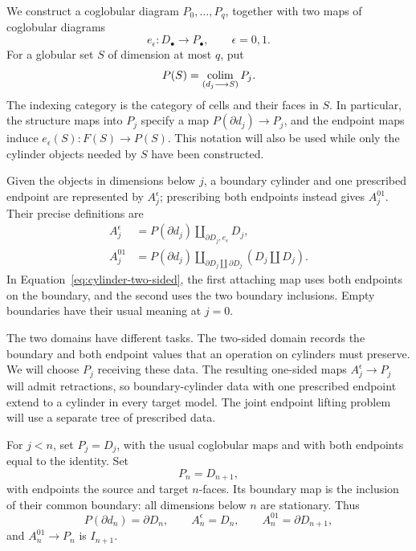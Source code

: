 We construct a coglobular diagram \(P_0,\ldots,P_q\), together with
two maps of coglobular diagrams
\[
             e_\epsilon:D_\bullet\longrightarrow P_\bullet,
             \qquad \epsilon=0,1.
\]
For a globular set \(S\) of dimension at most \(q\), put
\begin{equation}\label{eq:cylinder-realization}
 P(S)=\operatorname*{colim}_{(d_j\longrightarrow S)}P_j.
\end{equation}
The indexing category is the category of cells and their faces in
\(S\).  In particular, the structure maps into \(P_j\) specify a
map \(P(\partial d_j)\to P_j\), and the endpoint maps induce
\(e_\epsilon(S):F(S)\to P(S)\).  This notation will also be used
while only the cylinder objects needed by \(S\) have been constructed.

Given the objects in dimensions below \(j\), a boundary cylinder and
one prescribed endpoint are represented by \(A_j^\epsilon\); prescribing
both endpoints instead gives \(A_j^{01}\).  Their precise definitions are
\begin{align}
 A_j^\epsilon
   &=P(\partial d_j)\amalg_{\partial D_j,e_\epsilon}D_j,
       \label{eq:cylinder-one-sided}\\
 A_j^{01}
   &=P(\partial d_j)
       \amalg_{\partial D_j\amalg\partial D_j}
                    (D_j\amalg D_j).
       \label{eq:cylinder-two-sided}
\end{align}
In Equation~\eqref{eq:cylinder-two-sided}, the first attaching map uses
both endpoints on the boundary, and the second uses the two boundary
inclusions.  Empty boundaries have their usual meaning at \(j=0\).

The two domains have different tasks.  The two-sided domain records
the boundary and both endpoint values that an operation on cylinders
must preserve.  We will choose \(P_j\) receiving these data.  The
resulting one-sided maps \(A_j^\epsilon\to P_j\) will admit
retractions, so boundary-cylinder data with one prescribed endpoint
extend to a cylinder in every target model.  The joint endpoint lifting problem will use a
separate tree of prescribed data.

For \(j<n\), set \(P_j=D_j\), with the usual coglobular maps and
with both endpoints equal to the identity.  Set
\[
                  P_n=D_{n+1},
\]
with endpoints the source and target \(n\)-faces.  Its boundary map
is the inclusion of their common boundary: all dimensions below \(n\)
are stationary.  Thus
\begin{equation}\label{eq:cylinder-critical-level}
 P(\partial d_n)=\partial D_n,\qquad
 A_n^\epsilon=D_n,\qquad
 A_n^{01}=\partial D_{n+1},
\end{equation}
and \(A_n^{01}\to P_n\) is \(I_{n+1}\).

